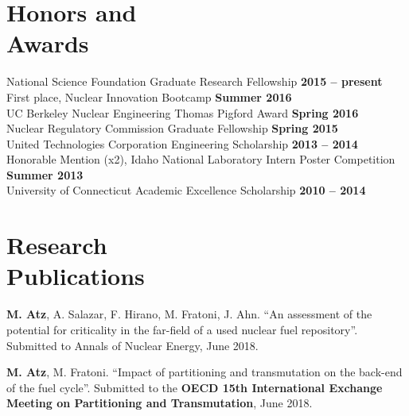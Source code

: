 \documentclass[margin,line]{resume}
\begin{document}
\begin{resume}

\section{\mysidestyle Honors and\\Awards}
National Science Foundation Graduate Research Fellowship \hfill \textbf{2015 -- present}\vspace{.5mm} \\
First place, Nuclear Innovation Bootcamp \hfill \textbf{Summer 2016}\vspace{.5mm} \\
UC Berkeley Nuclear Engineering Thomas Pigford Award \hfill \textbf{Spring 2016}\vspace{.5mm} \\	
Nuclear Regulatory Commission Graduate Fellowship \hfill \textbf{Spring 2015}\vspace{.5mm} \\
United Technologies Corporation Engineering Scholarship \hfill \textbf{2013 -- 2014}\vspace{.5mm} \\
Honorable Mention (x2), Idaho National Laboratory Intern Poster Competition \hfill \textbf{Summer 2013}\vspace{.5mm} \\
University of Connecticut Academic Excellence Scholarship \hfill \textbf{2010 -- 2014} \\


\section{\mysidestyle Research\\Publications}
\begin{bibenum}

    \item \textbf{M. Atz}, A. Salazar, F. Hirano, M. Fratoni, J. Ahn. ``An assessment of the potential for criticality in the far-field of a used nuclear fuel repository''. Submitted to Annals of Nuclear Energy, June 2018.
    
    \item \textbf{M. Atz}, M. Fratoni. ``Impact of partitioning and transmutation on the back-end of the fuel cycle''. Submitted to the \textbf{OECD 15th International Exchange Meeting on Partitioning and Transmutation}, June 2018.
        

\end{bibenum}
\end{resume}
\end{document}
